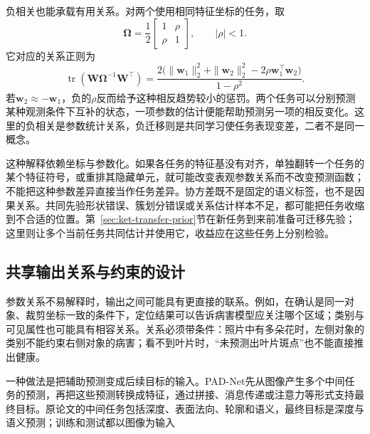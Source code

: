 负相关也能承载有用关系。对两个使用相同特征坐标的任务，取
\begin{equation}
  \bm\Omega=\frac12
  \begin{bmatrix}1&\rho\\\rho&1\end{bmatrix},
  \qquad |\rho|<1.
\end{equation}
它对应的关系正则为
\begin{equation}
  \operatorname{tr}(\bm W\bm\Omega^{-1}\bm W^{\top})
  =
  \frac{2\bigl(\|\bm w_1\|_2^2+\|\bm w_2\|_2^2
  -2\rho\bm w_1^{\top}\bm w_2\bigr)}
  {1-\rho^2}.
  \label{eq:ket-sharing-negative-correlation}
\end{equation}
若$\bm w_2\approx-\bm w_1$，负的$\rho$反而给予这种相反趋势较小的惩罚。两个任务可以分别预测某种观测条件下互补的状态，一项参数的估计便能帮助预测另一项的相反变化。这里的负相关是参数统计关系，负迁移则是共同学习使任务表现变差，二者不是同一概念。

这种解释依赖坐标与参数化。如果各任务的特征基没有对齐，单独翻转一个任务的某个特征符号，或重排其隐藏单元，就可能改变表观参数关系而不改变预测函数；不能把这种参数差异直接当作任务差异。协方差既不是固定的语义标签，也不是因果关系。共同先验形状错误、簇划分错误或关系估计样本不足，都可能把任务收缩到不合适的位置。第~\ref{sec:ket-transfer-prior}节在新任务到来前准备可迁移先验；这里则让多个当前任务共同估计并使用它，收益应在这些任务上分别检验。

\subsection{共享输出关系与约束的设计}
\label{sec:ket-sharing-outputs}

参数关系不易解释时，输出之间可能具有更直接的联系。例如，在确认是同一对象、裁剪坐标一致的条件下，定位结果可以告诉病害模型应关注哪个区域；类别与可见属性也可能具有相容关系。关系必须带条件：照片中有多朵花时，左侧对象的类别不能约束右侧对象的病害；看不到叶片时，“未预测出叶片斑点”也不能直接推出健康。

一种做法是把辅助预测变成后续目标的输入。PAD-Net先从图像产生多个中间任务的预测，再把这些预测转换成特征，通过拼接、消息传递或注意力等形式支持最终目标。原论文的中间任务包括深度、表面法向、轮廓和语义，最终目标是深度与语义预测；训练和测试都以图像为输入


